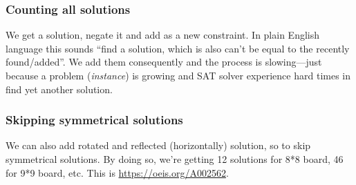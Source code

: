 \subsubsection{Counting all solutions}

We get a solution, negate it and add as a new constraint.
In plain English language this sounds ``find a solution, which is also can't be equal to the recently found/added''.
We add them consequently and the process is slowing---just because a problem (\textit{instance}) is growing and SAT solver
experience hard times in find yet another solution.

\subsubsection{Skipping symmetrical solutions}

We can also add rotated and reflected (horizontally) solution, so to skip symmetrical solutions.
By doing so, we're getting 12 solutions for 8*8 board, 46 for 9*9 board, etc.
This is \url{https://oeis.org/A002562}.

